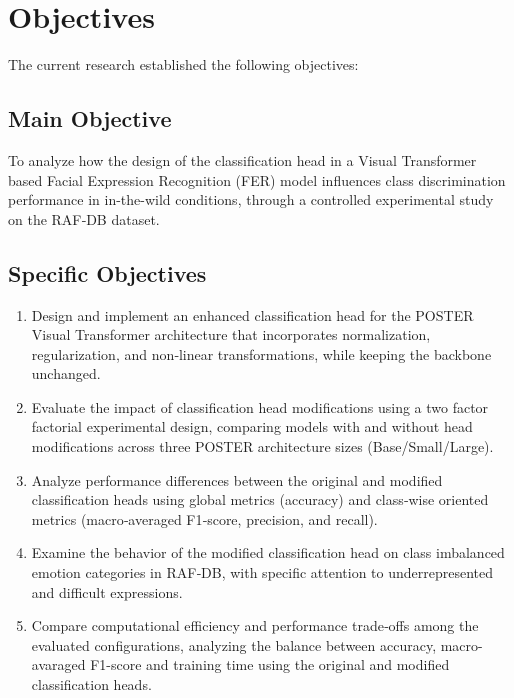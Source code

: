 \section{Objectives}
\label{section:objectives}
The current research established the following objectives:

\subsection{Main Objective}
\label{section:main-objective}
\label{objective:main}

To analyze how the design of the classification head in a Visual Transformer based Facial Expression Recognition (\gls{FER}) model influences class discrimination performance in \gls{in-the-wild} conditions, through a controlled experimental study on the RAF‑DB dataset.

\subsection{Specific Objectives}
\label{section:specific-objectives}
	
	
	

\begin{enumerate}

\item Design and implement an enhanced classification head for the POSTER Visual Transformer architecture that incorporates normalization, regularization, and non‑linear transformations, while keeping the backbone unchanged.


\item Evaluate the impact of classification head modifications using a two factor factorial experimental design, comparing models with and without head modifications across three POSTER architecture sizes (Base/Small/Large).


\item Analyze performance differences between the original and modified classification heads using global metrics (accuracy) and class‑wise oriented metrics  (macro‑averaged F1‑score, precision, and recall).


\item Examine the behavior of the modified classification head on class imbalanced emotion categories in RAF‑DB, with specific attention to underrepresented and difficult expressions.


\item Compare computational efficiency and performance trade‑offs among the evaluated configurations, analyzing the balance between accuracy, macro-avaraged F1-score  and training time using the original and modified classification heads.

\end{enumerate}

